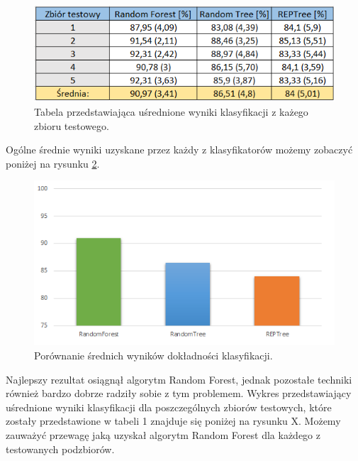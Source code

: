 \documentclass[conference]{IEEEtran}
\begin{document}
\begin{figure}[htbp]
\centerline{\includegraphics[scale=0.75]{pic/glowna_tabela.png}}
\caption{Tabela przedstawiająca uśrednione wyniki klasyfikacji z każego zbioru testowego.}
\label{mainTable}
\end{figure}

Ogólne średnie wyniki uzyskane przez każdy z klasyfikatorów możemy zobaczyć poniżej na rysunku \ref{accuracy}.

\begin{figure}[htbp]
\centerline{\includegraphics[scale=0.8]{pic/accuracy.png}}
\caption{Porównanie średnich wyników dokładności klasyfikacji.}
\label{accuracy}
\end{figure}

Najlepszy rezultat osiągnął algorytm Random Forest, jednak pozostałe techniki również bardzo dobrze radziły sobie z tym problemem. Wykres przedstawiający uśrednione wyniki klasyfikacji dla poszczególnych zbiorów testowych, które zostały przedstawione w tabeli 1 znajduje się poniżej na rysunku X. Możemy zauważyć przewagę jaką uzyskał algorytm Random Forest dla każdego z testowanych podzbiorów. 
\end{document}
